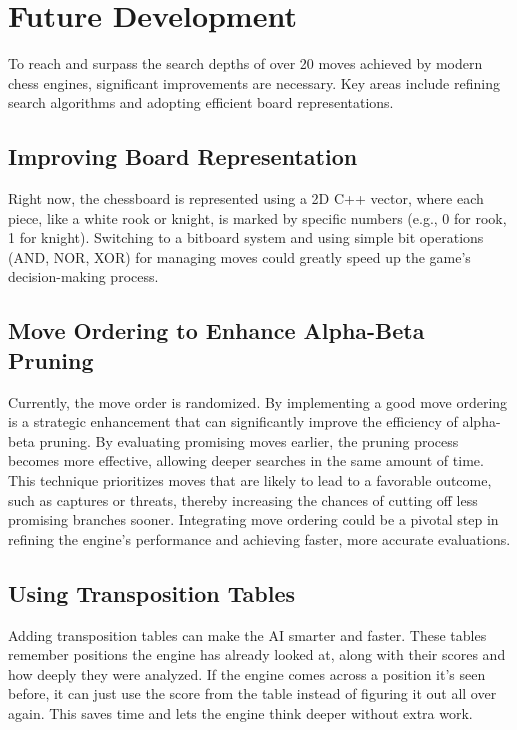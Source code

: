 \documentclass{article}
\begin{document}
\section{Future Development}

To reach and surpass the search depths of over 20 moves achieved by modern chess engines, significant improvements are necessary. Key areas include refining search algorithms and adopting efficient board representations.

\subsection{Improving Board Representation}

Right now, the chessboard is represented using a 2D C++ vector, where each piece, like a white rook or knight, is marked by specific numbers (e.g., 0 for rook, 1 for knight). Switching to a bitboard system and using simple bit operations (AND, NOR, XOR) for managing moves could greatly speed up the game's decision-making process.

\subsection{Move Ordering to Enhance Alpha-Beta Pruning}

Currently, the move order is randomized. By implementing a good move ordering is a strategic enhancement that can significantly improve the efficiency of alpha-beta pruning. By evaluating promising moves earlier, the pruning process becomes more effective, allowing deeper searches in the same amount of time. This technique prioritizes moves that are likely to lead to a favorable outcome, such as captures or threats, thereby increasing the chances of cutting off less promising branches sooner. Integrating move ordering could be a pivotal step in refining the engine's performance and achieving faster, more accurate evaluations.

\subsection{Using Transposition Tables}
Adding transposition tables can make the AI smarter and faster. These tables remember positions the engine has already looked at, along with their scores and how deeply they were analyzed. If the engine comes across a position it's seen before, it can just use the score from the table instead of figuring it out all over again. This saves time and lets the engine think deeper without extra work.
\end{document}
